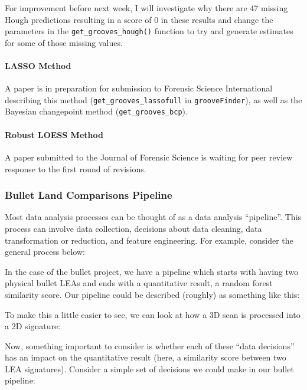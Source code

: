\documentclass[]{book}
\let\oldparagraph\paragraph
\renewcommand{\paragraph}[1]{\oldparagraph{#1}\mbox{}}
\begin{document}
For improvement before next week, I will investigate why there are 47 missing Hough
predictions resulting in a score of 0 in these results and change the parameters in the
\texttt{get\_grooves\_hough()} function to try and generate estimates for some of those missing values.

\hypertarget{lasso-method}{%
\paragraph{LASSO Method}\label{lasso-method}}

A paper is in preparation for submission to Forensic Science International describing this method (\texttt{get\_grooves\_lassofull} in \texttt{grooveFinder}), as well as the Bayesian changepoint method (\texttt{get\_grooves\_bcp}).

\hypertarget{robust-loess-method}{%
\paragraph{Robust LOESS Method}\label{robust-loess-method}}

A paper submitted to the Journal of Forensic Science is waiting for peer review response to the first round of revisions.

\hypertarget{bullet-land-comparisons-pipeline}{%
\subsubsection{Bullet Land Comparisons Pipeline}\label{bullet-land-comparisons-pipeline}}

Most data analysis processes can be thought of as a data analysis ``pipeline''. This process can involve data collection, decisions about data cleaning, data transformation or reduction, and feature engineering. For example, consider the general process below:

In the case of the bullet project, we have a pipeline which starts with having two physical bullet LEAs and ends with a quantitative result, a random forest similarity score. Our pipeline could be described (roughly) as something like this:

To make this a little easier to see, we can look at how a 3D scan is processed into a 2D signature:

Now, something important to consider is whether each of these ``data decisions'' has an impact on the quantitative result (here, a similarity score between two LEA signatures). Consider a simple set of decisions we could make in our bullet pipeline:
\end{document}
